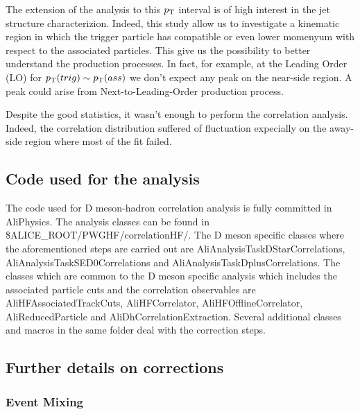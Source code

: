 The extension of the analysis to this $p_{\rm T}$ interval is of high interest in the jet structure characterizion. Indeed, this study allow us to investigate a kinematic region in which the trigger particle has compatible or even lower momenyum with respect to the associated particles. This give us the possibility to better understand the production processes. In fact, for example, at the Leading Order (LO) for $p_{\rm T} (trig) \sim p_{\rm T}(ass)$ we don't expect any peak on the near-side region. A peak could arise from Next-to-Leading-Order production process.

Despite the good statistics, it wasn't enough to perform the correlation analysis. Indeed, the correlation distribution suffered of fluctuation expecially on the away-side region where most of the fit failed. 



\subsection{Code used for the analysis}
The code used for D meson-hadron correlation analysis is fully committed in AliPhysics. The analysis classes can be found in
\$ALICE\_ROOT/PWGHF/correlationHF/.  The  D meson specific classes where the aforementioned steps are carried out are
AliAnalysisTaskDStarCorrelations, AliAnalysisTaskSED0Correlations and AliAnalysisTaskDplusCorrelations. The classes which are common to the D meson specific analysis which includes the associated particle cuts and the correlation observables are AliHFAssociatedTrackCuts, AliHFCorrelator, AliHFOfflineCorrelator, AliReducedParticle and AliDhCorrelationExtraction. Several additional classes and macros in the same folder deal with the correction steps.


\subsection{Further details on corrections}
\subsubsection{Event Mixing}


